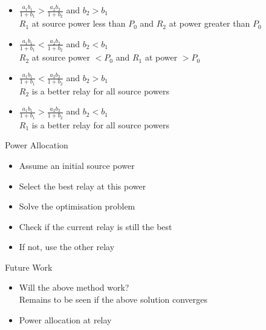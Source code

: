 \documentclass{beamer}
\begin{document}
\begin{frame}
	\begin{itemize}
		\item $\frac{a_1b_1}{1+b_1} >	\frac{a_2b_2}{1+b_2}$ and $b_2 > b_1$ \\
			$R_1$ at source power less than  $P_0$ and $R_2$ at power greater than $P_0$
		\item $\frac{a_1b_1}{1+b_1} < \frac{a_2b_2}{1+b_2}$ and $b_2 < b_1$ \\
			$R_2$ at source power $<P_0$ and $R_1$ at power $>P_0$
		\item $\frac{a_1b_1}{1+b_1} < \frac{a_2b_2}{1+b_2}$ and $b_2 > b_1$ \\
			$R_2$ is a better relay for all source powers
		\item $\frac{a_1b_1}{1+b_1} >	\frac{a_2b_2}{1+b_2}$ and $b_2 < b_1$ \\
			$R_1$ is a better relay for all source powers
	\end{itemize}
\end{frame}

\begin{frame}{Power Allocation}
	\vspace{1cm}
	\begin{itemize}  
		\item
			Assume an initial source power
		\item Select the best relay at this power
		\item Solve the optimisation problem
		\item Check if the current relay is still the best
		\item If not, use the other relay
	\end{itemize}
\end{frame}


\begin{frame}{Future Work}
	\vspace{1cm}
	\begin{itemize}  
		\item
			Will the above method work? \\
			Remains to be seen if the above solution converges
			\vspace{1cm}
			\pause
	
		\item Power allocation at relay
			\vspace{1cm}
	\end{itemize}
\end{frame}
\end{document}
